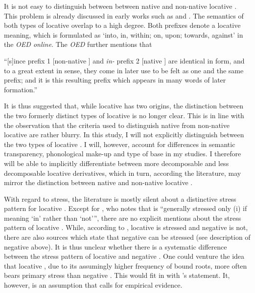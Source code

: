 It is not easy to distinguish between  between native and non-native locative . This problem is  already discussed in early works such as \citet[499]{Jespersen.1965} and \citet[164]{Marchand.1969}. The semantics of both types of locative  overlap to a high degree. Both prefixes denote a locative meaning, which is formulated as ‘into, in, within; on, upon; towards, against’ in the \textit{OED online}\nocite{OED.2013}. The \textit{OED} further mentions that 

\begin{displayquote}
``[s]ince  prefix 1 [non-native ] and \textit{ in-} prefix 2 [native ] are identical in form, and to a great extent in sense, they come in later use to be felt as one and the same prefix; and it is this resulting prefix which appears in many words of later formation.''
\end{displayquote}

It is thus suggested that, while locative  has two origins, the distinction between the two formerly distinct types of locative  is no longer clear. This is in line with the observation that the criteria used to distinguish native from non-native locative  are rather blurry. 
In this study, I will not explicitly distinguish between the two types of locative . I will, however, account for differences in semantic transparency, phonological make-up and type of base in my studies. I therefore will be able to implicitly differentiate between more decomposable and less decomposable locative derivatives, which in turn, according the literature, may mirror the distinction between native and non-native locative .

With regard to stress, the literature is mostly silent about a distinctive stress pattern for locative . Except for \citet[384]{Wells.2008}, who notes that  is ``generally stressed only
(i) if meaning `in' rather than `not''', there are no explicit mentions about the stress pattern of locative . While, according to \cite{Wells.2008}, locative  is stressed and negative  is not, there are also sources which state that negative  can be stressed (see description of negative  above). It is thus unclear whether there is a systematic difference between the stress pattern of locative and negative . One could venture the idea that locative , due to its assumingly higher frequency of bound roots, more often bears primary stress than negative . This would fit in with \citeauthor{Wells.2008}'s statement. It, however, is an assumption that calls for empirical evidence.

